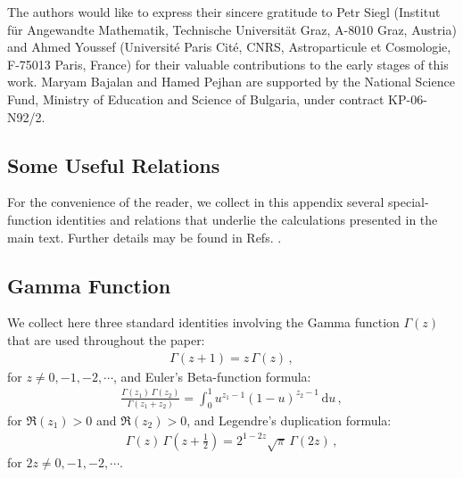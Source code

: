 \documentclass[aps,twocolumn,nofootinbib]{revtex4}
\begin{document}
{The authors would like to express their sincere gratitude to Petr Siegl (Institut f\"{u}r Angewandte Mathematik, Technische Universit\"{a}t Graz, A-8010 Graz, Austria) and Ahmed Youssef (Universit\'e Paris Cit\'e, CNRS, Astroparticule et Cosmologie, F-75013 Paris, France) for their valuable contributions to the early stages of this work. Maryam Bajalan and Hamed Pejhan are supported by the National Science Fund, Ministry of Education and Science of Bulgaria, under contract KP-06-N92/2.


\setcounter{equation}{0} 
\begin{appendix}


\section{Some Useful Relations}\label{Gauss-HF} 

For the convenience of the reader, we collect in this appendix several special-function identities and relations that underlie the calculations presented in the main text. Further details may be found in Refs. \cite{Olver2010, Magnus, Hua, Gradshteyn, Avery}.


\subsection{Gamma Function}\label{A-Gamma}

We collect here three standard identities involving the Gamma function $\Gamma(z)$ that are used throughout the paper:
\begin{align}\label{kha44}
    \Gamma(z+1) = z\, \Gamma(z)\,,
\end{align}
for $z\neq0,-1,-2,\cdots$, and Euler's Beta-function formula:
\begin{align}\label{beta function}
    \frac{\Gamma(z_1)\,\Gamma(z_2)} {\Gamma(z_1+z_2)} = \int_0^1 u^{z_1-1}(1-u)^{z_2-1}\,\mathrm{d}u\,, 
\end{align}
for $\Re(z_1)>0$ and $\Re(z_2)>0$, and Legendre's duplication formula: 
\begin{align}\label{Legendre}
    \Gamma(z) \,\Gamma\left(z+\tfrac{1}{2}\right) = 2^{1-2z}\sqrt{\pi}\,\Gamma(2z)\,,
\end{align}
for $2z\neq0,-1,-2,\cdots$.



\end{appendix}}
\end{document}
